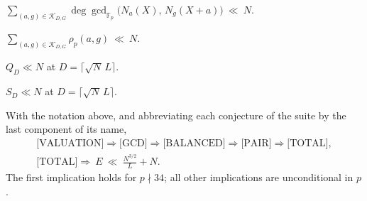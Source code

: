 \begin{conjecture}
\label{conj:sh-meso-shifted-gcd}
$\displaystyle
\sum_{(a,g)\in\mathcal K_{D,G}}
\deg\gcd_{\mathbb F_p}\bigl(N_a(X),\,N_g(X+a)\bigr)\ \ll\ N .$
\end{conjecture}

\begin{conjecture}
\label{conj:sh-meso-balanced-pair}
$\displaystyle
\sum_{(a,g)\in\mathcal K_{D,G}}\rho_p(a,g)\ \ll\ N .$
\end{conjecture}

\begin{conjecture}\label{conj:sh-meso-pair}
$Q_D\ll N$ at $D=\lceil\sqrt N\,L\rceil$.
\end{conjecture}

\begin{conjecture}\label{conj:sh-meso-total}
$S_D\ll N$ at $D=\lceil\sqrt N\,L\rceil$.
\end{conjecture}

\begin{proposition}\label{thm:sh-meso-chain}
With the notation above, and abbreviating each conjecture of the suite
by the last component of its name,
\begin{gather*}
 \text{[VALUATION]}
 \Longrightarrow\text{[GCD]}
 \Longrightarrow\text{[BALANCED]}
 \Longrightarrow\text{[PAIR]}
 \Longrightarrow\text{[TOTAL]},\\
 \text{[TOTAL]}
 \Longrightarrow\
 E\ \ll\ \frac{N^{3/2}}{L}+N .
\end{gather*}
The first implication holds for $p\nmid34$; all other implications are
unconditional in $p$.
\end{proposition}


